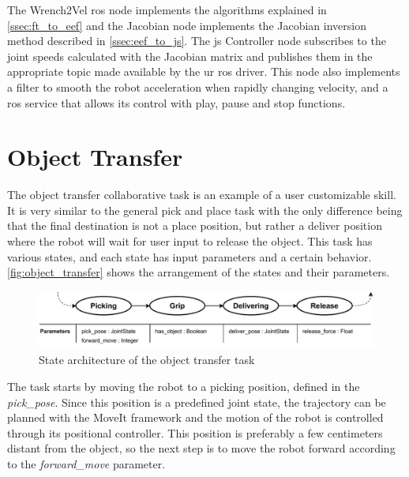 \par The Wrench2Vel \ac{ros} node implements the algorithms explained in \autoref{ssec:ft_to_eef} and the Jacobian node implements the Jacobian inversion method described in \autoref{ssec:eef_to_js}. The \ac{js} Controller node subscribes to the joint speeds calculated with the Jacobian matrix and publishes them in the appropriate topic made available by the \ac{ur} \ac{ros} driver. This node also implements a filter to smooth the robot acceleration when rapidly changing velocity, and a \ac{ros} service that allows its control with play, pause and stop functions.






\section{Object Transfer}


\par The object transfer collaborative task is an example of a user customizable skill. It is very similar to the general pick and place task with the only difference being that the final destination is not a place position, but rather a deliver position where the robot will wait for user input to release the object. This task has various states, and each state has input parameters and a certain behavior. \autoref{fig:object_transfer} shows the arrangement of the states and their parameters.

\begin{figure}[h]
    \centering
    \includegraphics[width=\linewidth]{figs/chp5/pick_and_deliver.pdf}
    \caption{State architecture of the object transfer task}
    \label{fig:object_transfer}
\end{figure}

\par The task starts by moving the robot to a picking position, defined in the \textit{pick\_pose}. Since this position is a predefined joint state, the trajectory can be planned with the MoveIt framework and the motion of the robot is controlled through its positional controller. This position is preferably a few centimeters distant from the object, so the next step is to move the robot forward according to the \textit{forward\_move} parameter.

